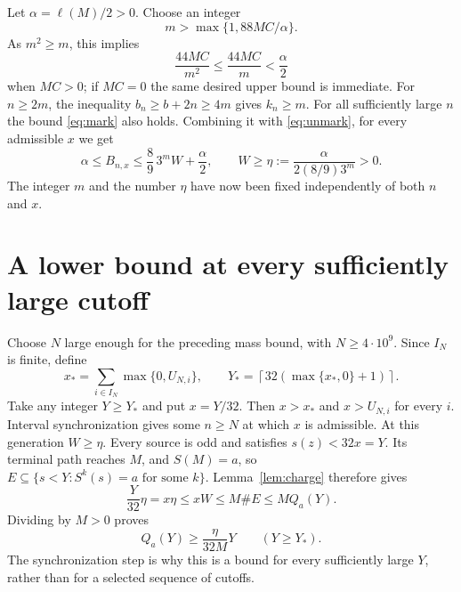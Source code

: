 \documentclass[11pt]{article}
\begin{document}
Let $\alpha=\ell(M)/2>0$. Choose an integer
\begin{equation}\label{eq:mchoice}
 m>\max\{1,88MC/\alpha\}.
\end{equation}
As $m^2\ge m$, this implies
\[
 \frac{44MC}{m^2}\le\frac{44MC}{m}<\frac\alpha2
\]
when $MC>0$; if $MC=0$ the same desired upper bound is immediate.
For $n\ge2m$, the inequality $b_n\ge b+2n\ge4m$ gives $k_n\ge m$.
For all sufficiently large $n$ the bound \eqref{eq:mark} also holds.
Combining it with \eqref{eq:unmark}, for every admissible $x$ we get
\[
 \alpha\le B_{n,x}\le\frac89\,3^mW+\frac\alpha2,
 \qquad W\ge\eta:=\frac{\alpha}{2(8/9)3^m}>0.
\]
The integer $m$ and the number $\eta$ have now been fixed independently
of both $n$ and $x$.

\section{A lower bound at every sufficiently large cutoff}
Choose $N$ large enough for the preceding mass bound, with
$N\ge4\cdot10^9$. Since $I_N$ is finite, define
\[
 x_* =\sum_{i\in I_N}\max\{0,U_{N,i}\},\qquad
 Y_* =\left\lceil32(\max\{x_*,0\}+1)\right\rceil.
\]
Take any integer $Y\ge Y_*$ and put $x=Y/32$. Then $x>x_*$ and
$x>U_{N,i}$ for every $i$. Interval synchronization gives some $n\ge N$
at which $x$ is admissible. At this generation $W\ge\eta$.
Every source is odd and satisfies $s(z)<32x=Y$. Its terminal path
reaches $M$, and $S(M)=a$, so $E\subseteq\{s<Y:S^k(s)=a\text{ for some }k\}$.
Lemma~\ref{lem:charge} therefore gives
\[
 \frac{Y}{32}\eta=x\eta\le xW\le M\#E\le M Q_a(Y).
\]
Dividing by $M>0$ proves
\begin{equation}\label{eq:odddensity}
 Q_a(Y)\ge\frac{\eta}{32M}Y\qquad(Y\ge Y_*).
\end{equation}
The synchronization step is why this is a bound for every sufficiently
large $Y$, rather than for a selected sequence of cutoffs.
\end{document}
